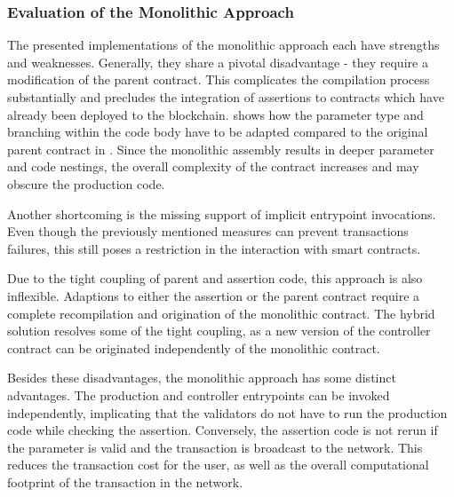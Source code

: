 

\subsubsection{Evaluation of the Monolithic Approach}
The presented implementations of the monolithic approach each have strengths and weaknesses. Generally, they share a pivotal disadvantage - they require a modification of the parent contract. This complicates the compilation process substantially and precludes the integration of assertions to contracts which have already been deployed to the blockchain.  shows how the parameter type and branching within the code body have to be adapted compared to the original parent contract in . Since the monolithic assembly results in deeper parameter and code nestings, the overall complexity of the contract increases and may obscure the production code.


Another shortcoming is the missing support of implicit entrypoint invocations. Even though the previously mentioned measures can prevent transactions failures, this still poses a restriction in the interaction with smart contracts. 

Due to the tight coupling of parent and assertion code, this approach is also inflexible. Adaptions to either the assertion or the parent contract require a complete recompilation and origination of the monolithic contract. The hybrid solution resolves some of the tight coupling, as a new version of the controller contract can be originated independently of the monolithic contract.

Besides these disadvantages, the monolithic approach has some distinct advantages. The production and controller entrypoints can be invoked independently, implicating that the validators do not have to run the production code while checking the assertion. Conversely, the assertion code is not rerun if the parameter is valid and the transaction is broadcast to the network. This reduces the transaction cost for the user, as well as the overall computational footprint of the transaction in the network.

